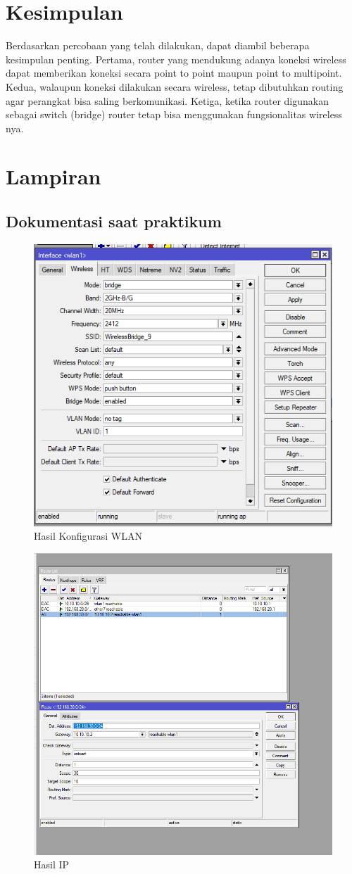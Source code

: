 \section{Kesimpulan}
Berdasarkan percobaan yang telah dilakukan, dapat diambil beberapa kesimpulan penting. Pertama, router yang mendukung adanya koneksi wireless dapat memberikan koneksi secara point to point maupun point to multipoint. Kedua, walaupun koneksi dilakukan secara wireless, tetap dibutuhkan routing agar perangkat bisa saling berkomunikasi. Ketiga, ketika router digunakan sebagai switch (bridge) router tetap bisa menggunakan fungsionalitas wireless nya.

\section{Lampiran}
\subsection{Dokumentasi saat praktikum}
\begin{figure}[htbp]
    \centering
    \includegraphics[width=0.5\linewidth]{dokum/Laptop 1/bridge.png} 
    \caption{Hasil Konfigurasi WLAN}
    \label{fig:ptp-router1}
\end{figure}

\begin{figure}[htbp]
    \centering
    \includegraphics[width=0.5\linewidth]{dokum/Laptop 1/ptp ip.png} 
    \caption{Hasil IP}
    \label{fig:ptp-ip}
\end{figure}

